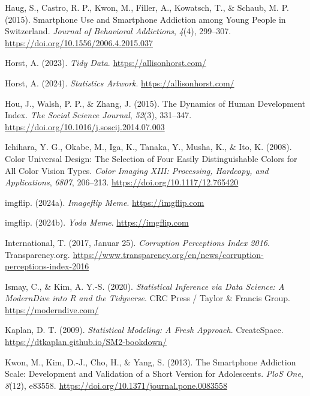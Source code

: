 \documentclass[
  letterpaper,
]{scrbook}
\newlength{\cslhangindent}
\newenvironment{CSLReferences}[2] %
 {\begin{list}{}{%
  \setlength{\itemindent}{0pt}
  \setlength{\leftmargin}{0pt}
  \setlength{\parsep}{0pt}
  \ifodd #1
   \setlength{\leftmargin}{\cslhangindent}
   \setlength{\itemindent}{-1\cslhangindent}
  \fi
  \setlength{\itemsep}{#2\baselineskip}}}
 {\end{list}}
\theoremstyle{definition}
\theoremstyle{definition}
\theoremstyle{definition}
\theoremstyle{remark}
\begin{document}
\begin{CSLReferences}{1}{0}
Haug, S., Castro, R. P., Kwon, M., Filler, A., Kowatsch, T., \& Schaub,
M. P. (2015). Smartphone Use and Smartphone Addiction among Young People
in {Switzerland}. \emph{Journal of Behavioral Addictions}, \emph{4}(4),
299--307. \url{https://doi.org/10.1556/2006.4.2015.037}

Horst, A. (2023). \emph{Tidy {Data}}. \url{https://allisonhorst.com/}

Horst, A. (2024). \emph{Statistics {Artwork}}.
\url{https://allisonhorst.com/}

Hou, J., Walsh, P. P., \& Zhang, J. (2015). The Dynamics of {Human
Development Index}. \emph{The Social Science Journal}, \emph{52}(3),
331--347. \url{https://doi.org/10.1016/j.soscij.2014.07.003}

Ichihara, Y. G., Okabe, M., Iga, K., Tanaka, Y., Musha, K., \& Ito, K.
(2008). Color Universal Design: The Selection of Four Easily
Distinguishable Colors for All Color Vision Types. \emph{Color {Imaging
XIII}: {Processing}, {Hardcopy}, and {Applications}}, \emph{6807},
206--213. \url{https://doi.org/10.1117/12.765420}

imgflip. (2024a). \emph{Imageflip {Meme}}. \url{https://imgflip.com}

imgflip. (2024b). \emph{Yoda {Meme}}. \url{https://imgflip.com}

International, T. (2017, Januar 25). \emph{Corruption {Perceptions
Index} 2016}. Transparency.org.
\url{https://www.transparency.org/en/news/corruption-perceptions-index-2016}

Ismay, C., \& Kim, A. Y.-S. (2020). \emph{Statistical Inference via Data
Science: A {ModernDive} into {R} and the {Tidyverse}}. CRC Press /
Taylor \& Francis Group. \url{https://moderndive.com/}

Kaplan, D. T. (2009). \emph{Statistical Modeling: A Fresh Approach}.
CreateSpace. \url{https://dtkaplan.github.io/SM2-bookdown/}

Kwon, M., Kim, D.-J., Cho, H., \& Yang, S. (2013). The Smartphone
Addiction Scale: Development and Validation of a Short Version for
Adolescents. \emph{PloS One}, \emph{8}(12), e83558.
\url{https://doi.org/10.1371/journal.pone.0083558}


\end{CSLReferences}
\end{document}
